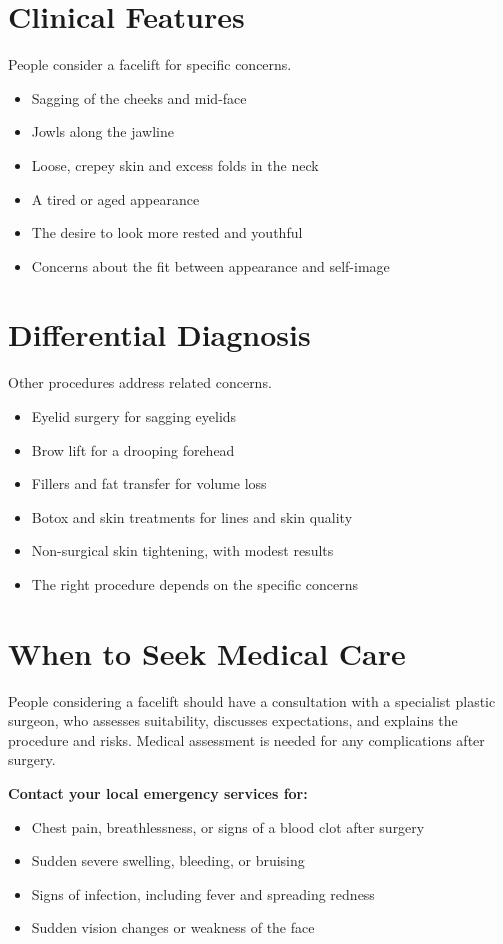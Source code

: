 \section*{Clinical Features}
People consider a facelift for specific concerns.
\begin{itemize}
    \item Sagging of the cheeks and mid-face
    \item Jowls along the jawline
    \item Loose, crepey skin and excess folds in the neck
    \item A tired or aged appearance
    \item The desire to look more rested and youthful
    \item Concerns about the fit between appearance and self-image
\end{itemize}

\section*{Differential Diagnosis}
Other procedures address related concerns.
\begin{itemize}
    \item Eyelid surgery for sagging eyelids
    \item Brow lift for a drooping forehead
    \item Fillers and fat transfer for volume loss
    \item Botox and skin treatments for lines and skin quality
    \item Non-surgical skin tightening, with modest results
    \item The right procedure depends on the specific concerns
\end{itemize}

\section*{When to Seek Medical Care}
People considering a facelift should have a consultation with a specialist plastic surgeon, who assesses suitability, discusses expectations, and explains the procedure and risks. Medical assessment is needed for any complications after surgery.

\textbf{Contact your local emergency services for:}
\begin{itemize}
    \item Chest pain, breathlessness, or signs of a blood clot after surgery
    \item Sudden severe swelling, bleeding, or bruising
    \item Signs of infection, including fever and spreading redness
    \item Sudden vision changes or weakness of the face
\end{itemize}


